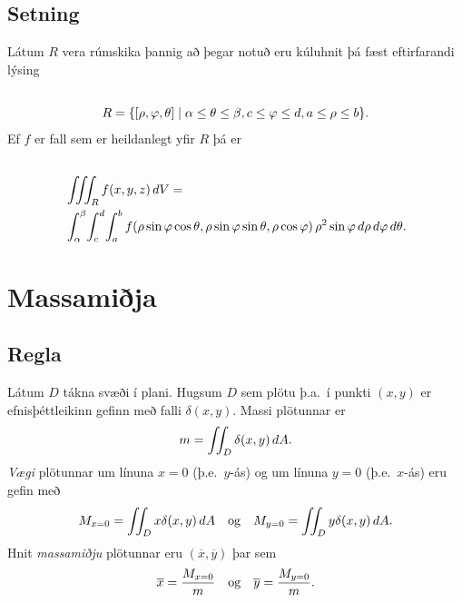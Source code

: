 \documentclass[a4paper,10pt,icelandic]{sphinxmanual}
\begin{document}
\subsection{Setning}
\label{Kafli4:id21}
Látum \(R\) vera rúmskika þannig að þegar notuð eru kúluhnit þá fæst
eftirfarandi lýsing
\begin{gather}
\begin{split}\displaystyle\end{split}\notag\\\begin{split}R=\{[\rho,\varphi,\theta]\mid \alpha\leq\theta\leq\beta,
c\leq\varphi\leq d, a\leq \rho\leq b\}.\end{split}\notag
\end{gather}
Ef \(f\) er fall sem er heildanlegt yfir \(R\) þá er
\begin{gather}
\begin{split}\displaystyle\end{split}\notag\\\begin{split}\begin{aligned}
&\int\!\!\!\int\!\!\!\int_R f(x,y,z)\,dV=\\ &\int_\alpha^\beta\!\int_c^d\!\int_a^b f(\rho\sin\varphi\cos\theta, \rho\sin\varphi\sin\theta,\rho\cos\varphi)
\,\rho^2\sin\varphi\,d\rho\,d\varphi\,d\theta.\end{aligned}\end{split}\notag
\end{gather}

\section{Massamiðja}
\label{Kafli4:massamija}

\subsection{Regla}
\label{Kafli4:id22}
Látum \(D\) tákna svæði í plani. Hugsum \(D\) sem plötu þ.a. í
punkti \((x,y)\) er efnisþéttleikinn gefinn með falli
\(\delta(x,y)\). Massi plötunnar er
\begin{gather}
\begin{split}\displaystyle m=\int\!\!\!\int_D \delta(x,y)\,dA.\end{split}\notag
\end{gather}
\emph{Vægi} plötunnar um línuna \(x=0\) (þ.e. \(y\)-ás) og um línuna
\(y=0\) (þ.e. \(x\)-ás) eru gefin með
\begin{gather}
\begin{split}\displaystyle M_{x=0}=\int\!\!\!\int_D x\delta(x,y)\,dA \quad \text{og} \quad M_{y=0}=\int\!\!\!\int_D y\delta(x,y)\,dA.\end{split}\notag
\end{gather}
Hnit \emph{massamiðju} plötunnar eru \((\overline{x}, \overline{y})\) þar
sem
\begin{gather}
\begin{split}\displaystyle \overline{x}=\frac{M_{x=0}}{m} \quad \text{og}\quad \overline{y}=\frac{M_{y=0}}{m}.\end{split}\notag
\end{gather}
\end{document}
